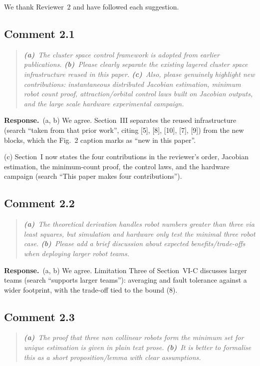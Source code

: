 \documentclass[10pt]{article}
\newcommand{\resp}{\par\textbf{Response.}~}
\begin{document}
We thank Reviewer~2 and have followed each suggestion.

\subsection*{Comment 2.1}

\begin{quote}\itshape
\textbf{(a)}~The cluster space control framework is adopted from earlier publications.
\textbf{(b)}~Please clearly separate the existing layered cluster space infrastructure reused in this paper.
\textbf{(c)}~Also, please genuinely highlight new contributions: instantaneous distributed Jacobian estimation, minimum robot count proof, attraction/orbital control laws built on Jacobian outputs, and the large scale hardware experimental campaign.
\end{quote}

\resp (a, b) We agree. Section~III separates the reused infrastructure (search ``taken from that prior work'', citing [5], [8], [10], [7], [9]) from the new blocks, which the Fig.~2 caption marks as ``new in this paper''.

(c) Section~I now states the four contributions in the reviewer's order, Jacobian estimation, the minimum-count proof, the control laws, and the hardware campaign (search ``This paper makes four contributions'').

\subsection*{Comment 2.2}

\begin{quote}\itshape
\textbf{(a)}~The theoretical derivation handles robot numbers greater than three via least squares, but simulation and hardware only test the minimal three robot case.
\textbf{(b)}~Please add a brief discussion about expected benefits/trade-offs when deploying larger robot teams.
\end{quote}

\resp (a, b) We agree. Limitation Three of Section~VI-C discusses larger teams (search ``supports larger teams''): averaging and fault tolerance against a wider footprint, with the trade-off tied to the bound (8).

\subsection*{Comment 2.3}

\begin{quote}\itshape
\textbf{(a)}~The proof that three non collinear robots form the minimum set for unique estimation is given in plain text prose.
\textbf{(b)}~It is better to formalise this as a short proposition/lemma with clear assumptions.
\end{quote}
\end{document}
